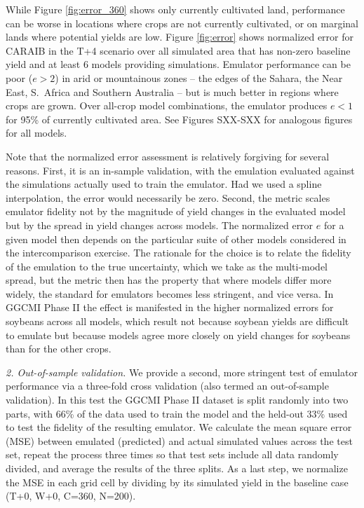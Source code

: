 \documentclass[gmd, manuscript]{copernicus} %
\begin{document}
While Figure \ref{fig:error_360} shows only currently cultivated land, performance can be worse in locations where crops are not currently cultivated, or on marginal lands where potential yields are low. 
Figure \ref{fig:error} shows normalized error for CARAIB in the T+4 scenario over all simulated area that has non-zero baseline yield and at least 6 models providing simulations.  
Emulator performance can be poor ($e > 2$) in arid or mountainous zones -- the edges of the Sahara, the Near East, S.\ Africa and Southern Australia -- but is much better in regions where crops are grown. 
Over all-crop model combinations, the emulator produces $e < 1$ for 95\% of currently cultivated area.
See Figures SXX-SXX for analogous figures for all models.

Note that the normalized error assessment is relatively forgiving for several reasons. 
First, it is an in-sample validation, with the emulation evaluated against the simulations actually used to train the emulator. 
Had we used a spline interpolation, the error would necessarily be zero. 
Second, the metric scales emulator fidelity not by the magnitude of yield changes in the evaluated model but by the spread in yield changes across models. 
The normalized error $e$ for a given model then depends on the particular suite of other models considered in the intercomparison exercise.  
The rationale for the choice is to relate the fidelity of the emulation to the true uncertainty, which we take as the multi-model spread, but  
the metric then has the property that where models differ more widely, the standard for emulators becomes less stringent, and vice versa.
In GGCMI Phase II the effect is manifested in the higher normalized errors for soybeans across all models, which result not because soybean yields are difficult to emulate but because models agree more closely on yield changes for soybeans than for the other crops. %

\smallskip
\textit{2. Out-of-sample validation.} We provide a second, more stringent test of emulator performance via a three-fold cross validation (also termed an out-of-sample validation). 
In this test the GGCMI Phase II dataset is split randomly into two parts, with 66\% of the data used to train the model and the held-out 33\% used to test the fidelity of the resulting emulator.
We calculate the mean square error (MSE) between emulated (predicted) and actual simulated values across the test set, repeat the process three times so that test sets include all data randomly divided, and average the results of the three splits. 
As a last step, we normalize the MSE in each grid cell by dividing by its simulated yield in the baseline case (T+0, W+0, C=360, N=200). 
\end{document}

